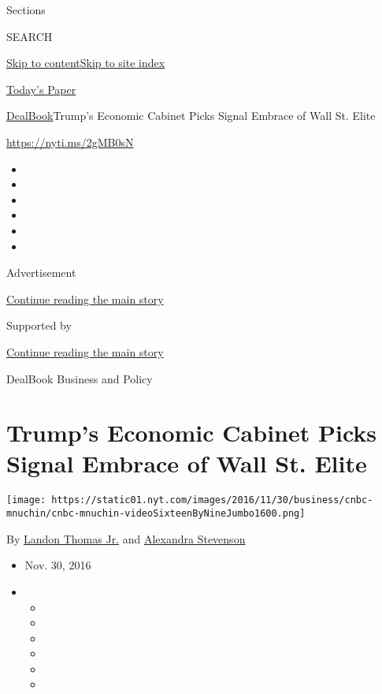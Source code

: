 Sections

SEARCH

\protect\hyperlink{site-content}{Skip to
content}\protect\hyperlink{site-index}{Skip to site index}

\href{https://myaccount.nytimes.com/auth/login?response_type=cookie\&client_id=vi}{}

\href{https://www.nytimes.com/section/todayspaper}{Today's Paper}

\href{/section/business/dealbook}{DealBook}\textbar{}Trump's Economic
Cabinet Picks Signal Embrace of Wall St. Elite

\url{https://nyti.ms/2gMB0sN}

\begin{itemize}
\item
\item
\item
\item
\item
\item
\end{itemize}

Advertisement

\protect\hyperlink{after-top}{Continue reading the main story}

Supported by

\protect\hyperlink{after-sponsor}{Continue reading the main story}

DealBook Business and Policy

\hypertarget{trumps-economic-cabinet-picks-signal-embrace-of-wall-st-elite}{%
\section{Trump's Economic Cabinet Picks Signal Embrace of Wall St.
Elite}\label{trumps-economic-cabinet-picks-signal-embrace-of-wall-st-elite}}

\texttt{[image: https://static01.nyt.com/images/2016/11/30/business/cnbc-mnuchin/cnbc-mnuchin-videoSixteenByNineJumbo1600.png]}

By \href{http://www.nytimes.com/by/landon-thomas-jr}{Landon Thomas Jr.}
and \href{http://www.nytimes.com/by/alexandra-stevenson}{Alexandra
Stevenson}

\begin{itemize}
\item
  Nov. 30, 2016
\item
  \begin{itemize}
  \item
  \item
  \item
  \item
  \item
  \item
  \end{itemize}
\end{itemize}

